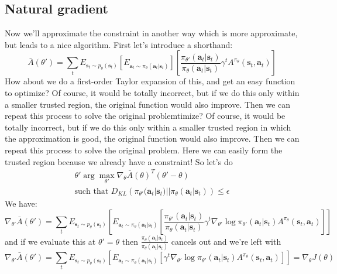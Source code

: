 \documentclass{report}
\newcommand{\argmax}{\arg\!\max}
\begin{document}
\subsection{Natural gradient}
Now we'll approximate the constraint in another way which is more approximate,
but leads to a nice algorithm.
First let's introduce a shorthand:
\begin{equation}
		\bar{A} (\theta') =
\sum_{t}^{} E_{ \bm{s}_{t}\sim p_{ \theta } (\bm{s}_{t}) }
		\left[ E_{ \bm{a}_{t}\sim \pi_{ \theta } (\bm{a}_{t}| \bm{s}_{t} ) } \right]
		\left[ \frac{\pi_{ \theta' }(\bm{a}_{t}| \bm{s}_{t} )}{\pi_{ \theta }(\bm{a}_{t}| \bm{s}_{t} )} 
		\gamma^{ t } A^{ \pi_{ \theta } } (\bm{s}_{t}, \bm{a}_{t} )\right]
\end{equation}
How about we do a first-order Taylor expansion of this,
and get an easy function to optimize?
Of course, it would be totally incorrect, but if we do this only within
a smaller trusted region, the original function would also improve.
Then we can repeat this process to solve the original problemtimize?
Of course, it would be totally incorrect, but if we do this only within
a smaller trusted region in which the approximation is good, the original function would also improve.
Then we can repeat this process to solve the original problem.
Here we can easily form the trusted region 
because we already have a constraint!
So let's do
\begin{gather}
		\theta' \argmax_{\theta'} \nabla_{ \theta } \bar{A} (\theta)^{ T } (\theta' - \theta) \\
		\text{such that } D_{ KL } \left( 
\pi_{ \theta' } (\bm{a}_{t}| \bm{s}_{t} ) ||
\pi_{ \theta } (\bm{a}_{t}| \bm{s}_{t} ) 
		\right) \leq \epsilon
\end{gather}
We have:
\begin{equation}
\nabla_{ \theta' } \bar{A} (\theta') = 
\sum_{t}^{} E_{ \bm{s}_{t}\sim p_{ \theta } (\bm{s}_{t})} \left[ 
E_{ \bm{a}_{t} \sim \pi_{ \theta }(\bm{a}_{t}| \bm{s}_{t} ) }
\left[ 
\frac{\pi_{ \theta' }(\bm{a}_{t}| \bm{s}_{t} )}{\pi_{ \theta }(\bm{a}_{t}| \bm{s}_{t} )}
\gamma^{ t } \nabla_{ \theta' } \log \pi_{ \theta' } (\bm{a}_{t}| \bm{s}_{t} )
A^{ \pi_{ \theta } } (\bm{s}_{t}, \bm{a}_{t} )
\right] 
\right] 
\end{equation}
and if we evaluate this at $ \theta' = \theta  $ then
$\frac{\pi_{ \theta }(\bm{a}_{t}| \bm{s}_{t} )}{\pi_{ \theta }(\bm{a}_{t}| \bm{s}_{t} )}$ cancels out
and we're left with
\begin{equation}
\nabla_{ \theta' } \bar{A} (\theta') = 
\sum_{t}^{} E_{ \bm{s}_{t}\sim p_{ \theta } (\bm{s}_{t})} \left[ 
E_{ \bm{a}_{t} \sim \pi_{ \theta }(\bm{a}_{t}| \bm{s}_{t} ) }
\left[ 
\gamma^{ t } \nabla_{ \theta' } \log \pi_{ \theta' } (\bm{a}_{t}| \bm{s}_{t} )
A^{ \pi_{ \theta } } (\bm{s}_{t}, \bm{a}_{t} )
\right] 
\right] = \nabla_{ \theta } J (\theta)
\end{equation}
\end{document}
